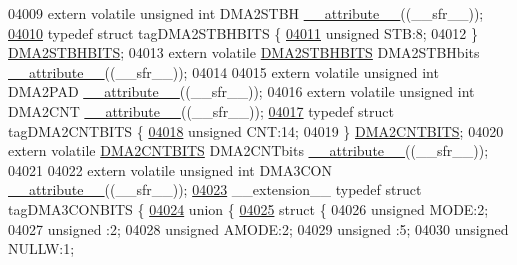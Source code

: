 \begin{DoxyCode}
04009 \textcolor{keyword}{extern} \textcolor{keyword}{volatile} \textcolor{keywordtype}{unsigned} \textcolor{keywordtype}{int}  DMA2STBH \hyperlink{a00015_a493c46f03454991ccc5aa7a6e1dfb2a7}{\_\_attribute\_\_}((\_\_sfr\_\_));
\hypertarget{a00015_source_l04010}{}\hyperlink{a00014}{04010} \textcolor{keyword}{typedef} \textcolor{keyword}{struct }tagDMA2STBHBITS \{
\hypertarget{a00015_source_l04011}{}\hyperlink{a00014_a9bd043a4db27e09b5035a563a8758fe7}{04011}   \textcolor{keywordtype}{unsigned} STB:8;
04012 \} \hyperlink{a00014_db/d43/a00422}{DMA2STBHBITS};
04013 \textcolor{keyword}{extern} \textcolor{keyword}{volatile} \hyperlink{a00014_db/d43/a00422}{DMA2STBHBITS} DMA2STBHbits \hyperlink{a00015_a493c46f03454991ccc5aa7a6e1dfb2a7}{\_\_attribute\_\_}((\_\_sfr\_\_));
04014 
04015 \textcolor{keyword}{extern} \textcolor{keyword}{volatile} \textcolor{keywordtype}{unsigned} \textcolor{keywordtype}{int}  DMA2PAD \hyperlink{a00015_a493c46f03454991ccc5aa7a6e1dfb2a7}{\_\_attribute\_\_}((\_\_sfr\_\_));
04016 \textcolor{keyword}{extern} \textcolor{keyword}{volatile} \textcolor{keywordtype}{unsigned} \textcolor{keywordtype}{int}  DMA2CNT \hyperlink{a00015_a493c46f03454991ccc5aa7a6e1dfb2a7}{\_\_attribute\_\_}((\_\_sfr\_\_));
\hypertarget{a00015_source_l04017}{}\hyperlink{a00014}{04017} \textcolor{keyword}{typedef} \textcolor{keyword}{struct }tagDMA2CNTBITS \{
\hypertarget{a00015_source_l04018}{}\hyperlink{a00014_a30be39d82c244f19fd98dd74227487f6}{04018}   \textcolor{keywordtype}{unsigned} CNT:14;
04019 \} \hyperlink{a00014_d4/dbc/a00414}{DMA2CNTBITS};
04020 \textcolor{keyword}{extern} \textcolor{keyword}{volatile} \hyperlink{a00014_d4/dbc/a00414}{DMA2CNTBITS} DMA2CNTbits \hyperlink{a00015_a493c46f03454991ccc5aa7a6e1dfb2a7}{\_\_attribute\_\_}((\_\_sfr\_\_));
04021 
04022 \textcolor{keyword}{extern} \textcolor{keyword}{volatile} \textcolor{keywordtype}{unsigned} \textcolor{keywordtype}{int}  DMA3CON \hyperlink{a00015_a493c46f03454991ccc5aa7a6e1dfb2a7}{\_\_attribute\_\_}((\_\_sfr\_\_));
\hypertarget{a00015_source_l04023}{}\hyperlink{a00014}{04023} \_\_extension\_\_ \textcolor{keyword}{typedef} \textcolor{keyword}{struct }tagDMA3CONBITS \{
\hypertarget{a00015_source_l04024}{}\hyperlink{a00015}{04024}   \textcolor{keyword}{union }\{
\hypertarget{a00015_source_l04025}{}\hyperlink{a00015}{04025}     \textcolor{keyword}{struct }\{
04026       \textcolor{keywordtype}{unsigned} MODE:2;
04027       \textcolor{keywordtype}{unsigned} :2;
04028       \textcolor{keywordtype}{unsigned} AMODE:2;
04029       \textcolor{keywordtype}{unsigned} :5;
04030       \textcolor{keywordtype}{unsigned} NULLW:1;

\end{DoxyCode}
